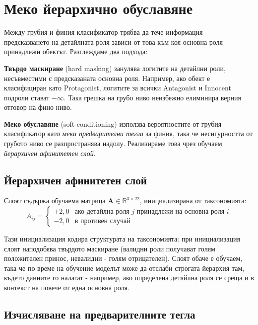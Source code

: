 \documentclass[12pt,a4paper]{report}
\begin{document}
\section{Меко йерархично обуславяне}
\label{sec:soft_conditioning}

Между грубия и финия класификатор трябва да тече информация - предсказването на детайлната роля зависи от това към коя основна роля принадлежи обектът. Разглеждаме два подхода:

\textbf{Твърдо маскиране} (hard masking) занулява логитите на детайлни роли, несъвместими с предсказаната основна роля. Например, ако обект е класифициран като Protagonist, логитите за всички Antagonist и Innocent подроли стават $-\infty$. Така грешка на грубо ниво неизбежно елиминира верния отговор на фино ниво.

\textbf{Меко обуславяне} (soft conditioning) \cite{wehrmann2018hierarchical} използва вероятностите от грубия класификатор като \textit{меки предварителни тегла} за финия, така че несигурността от грубото ниво се разпространява надолу. Реализираме това чрез обучаем \textit{йерархичен афинитетен слой}.

\subsection{Йерархичен афинитетен слой}

Слоят съдържа обучаема матрица $\mathbf{A} \in \mathbb{R}^{3 \times 22}$, инициализирана от таксономията:
\begin{equation}
  A_{ij} = \begin{cases}
    +2{,}0 & \text{ако детайлна роля } j \text{ принадлежи на основна роля } i \\
    -2{,}0 & \text{в противен случай}
  \end{cases}
  \label{eq:affinity_init}
\end{equation}

Тази инициализация кодира структурата на таксономията: при инициализация слоят наподобява твърдото маскиране (валидни роли получават голям положителен принос, невалидни - голям отрицателен). Слоят обаче е обучаем, така че по време на обучение моделът може да отслаби строгата йерархия там, където данните го налагат - например, ако определена детайлна роля се среща и в контекст на повече от една основна роля.

\subsection{Изчисляване на предварителните тегла}
\end{document}

